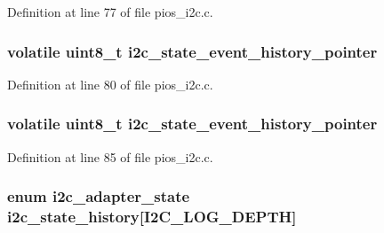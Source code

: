 \-Definition at line 77 of file pios\-\_\-i2c.\-c.

\hypertarget{group___p_i_o_s___i2_c_gabdb9d9357371d1ece20779da0d69d27b}{
\subsubsection[{i2c\-\_\-state\-\_\-event\-\_\-history\-\_\-pointer}]{\setlength{\rightskip}{0pt plus 5cm}volatile uint8\-\_\-t {\bf i2c\-\_\-state\-\_\-event\-\_\-history\-\_\-pointer}}}\label{group___p_i_o_s___i2_c_gabdb9d9357371d1ece20779da0d69d27b}


\-Definition at line 80 of file pios\-\_\-i2c.\-c.

\hypertarget{group___p_i_o_s___i2_c_gabdb9d9357371d1ece20779da0d69d27b}{
\subsubsection[{i2c\-\_\-state\-\_\-event\-\_\-history\-\_\-pointer}]{\setlength{\rightskip}{0pt plus 5cm}volatile uint8\-\_\-t {\bf i2c\-\_\-state\-\_\-event\-\_\-history\-\_\-pointer}}}\label{group___p_i_o_s___i2_c_gabdb9d9357371d1ece20779da0d69d27b}


\-Definition at line 85 of file pios\-\_\-i2c.\-c.

\hypertarget{group___p_i_o_s___i2_c_ga207839e0ce4c1011c30ea9254657251c}{
\subsubsection[{i2c\-\_\-state\-\_\-history}]{\setlength{\rightskip}{0pt plus 5cm}enum {\bf i2c\-\_\-adapter\-\_\-state} {\bf i2c\-\_\-state\-\_\-history}\mbox{[}\-I2\-C\-\_\-\-L\-O\-G\-\_\-\-D\-E\-P\-T\-H\mbox{]}}}\label{group___p_i_o_s___i2_c_ga207839e0ce4c1011c30ea9254657251c}


